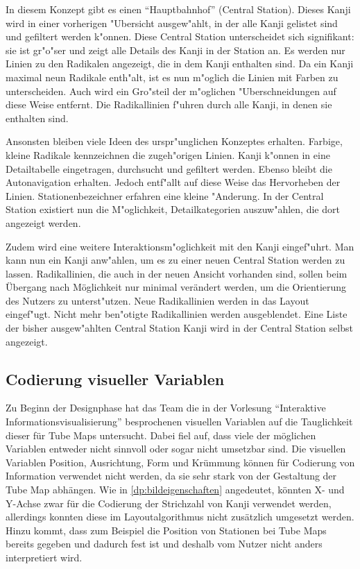 In diesem Konzept gibt es einen "`Hauptbahnhof"' (Central Station). Dieses Kanji wird in einer vorherigen "Ubersicht ausgew"ahlt, in der alle Kanji gelistet sind und gefiltert werden k"onnen. Diese Central Station unterscheidet sich signifikant: sie ist gr"o"ser und zeigt alle Details des Kanji in der Station an. Es werden nur Linien zu den Radikalen angezeigt, die in dem Kanji enthalten sind. Da ein Kanji maximal neun Radikale enth"alt, ist es nun m"oglich die Linien mit Farben zu unterscheiden. Auch wird ein Gro"steil der m"oglichen "Uberschneidungen auf diese Weise entfernt. Die Radikallinien f"uhren durch alle Kanji, in denen sie enthalten sind.

Ansonsten bleiben viele Ideen des urspr"unglichen Konzeptes erhalten. Farbige, kleine Radikale kennzeichnen die zugeh"origen Linien. Kanji k"onnen in eine Detailtabelle eingetragen, durchsucht und gefiltert werden. Ebenso bleibt die Autonavigation erhalten. Jedoch entf"allt auf diese Weise das Hervorheben der Linien. Stationenbezeichner erfahren eine kleine "Anderung. In der Central Station existiert nun die M"oglichkeit, Detailkategorien auszuw"ahlen, die dort angezeigt werden. 

Zudem wird eine weitere Interaktionsm"oglichkeit mit den Kanji eingef"uhrt. Man kann nun ein Kanji anw"ahlen, um es zu einer neuen Central Station werden zu lassen. Radikallinien, die auch in der neuen Ansicht vorhanden sind, sollen beim Übergang nach Möglichkeit nur minimal verändert werden, um die Orientierung des Nutzers zu unterst"utzen. Neue Radikallinien werden in das Layout eingef"ugt. Nicht mehr ben"otigte Radikallinien werden ausgeblendet. Eine Liste der bisher ausgew"ahlten Central Station Kanji wird in der Central Station selbst angezeigt.

\subsection{Codierung visueller Variablen}
Zu Beginn der Designphase hat das Team die in der Vorlesung "`Interaktive Informationsvisualisierung"' besprochenen visuellen Variablen auf die Tauglichkeit dieser für Tube Maps untersucht. Dabei fiel auf, dass viele der möglichen Variablen entweder nicht sinnvoll oder sogar nicht umsetzbar sind. Die visuellen Variablen Position, Ausrichtung, Form und Krümmung können für Codierung von Information verwendet nicht werden, da sie sehr stark von der Gestaltung der Tube Map abhängen. Wie in \ref{dp:bildeigenschaften} angedeutet, könnten X- und Y-Achse zwar für die Codierung der Strichzahl von Kanji verwendet werden, allerdings konnten diese im Layoutalgorithmus nicht zusätzlich umgesetzt werden. Hinzu kommt, dass zum Beispiel die Position von Stationen bei Tube Maps bereits gegeben und dadurch fest ist und deshalb vom Nutzer nicht anders interpretiert wird.

